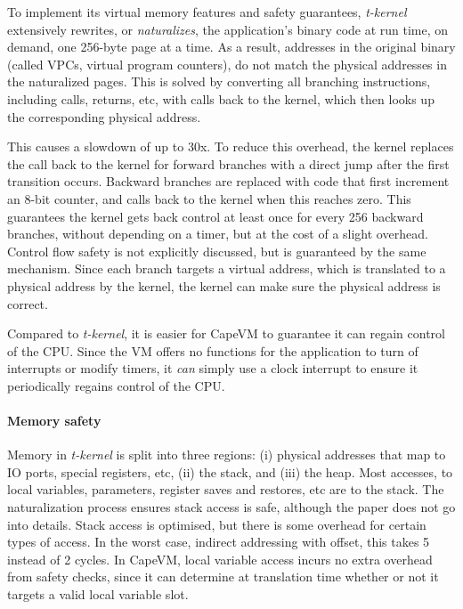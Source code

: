 To implement its virtual memory features and safety guarantees, \emph{t-kernel} extensively rewrites, or \emph{naturalizes}, the application's binary code at run time, on demand, one 256-byte page at a time. As a result, addresses in the original binary (called VPCs, virtual program counters), do not match the physical addresses in the naturalized pages. This is solved by converting all branching instructions, including calls, returns, etc, with calls back to the kernel, which then looks up the corresponding physical address.

This causes a slowdown of up to 30x. To reduce this overhead, the kernel replaces the call back to the kernel for forward branches with a direct jump after the first transition occurs. Backward branches are replaced with code that first increment an 8-bit counter, and calls back to the kernel when this reaches zero. This guarantees the kernel gets back control at least once for every 256 backward branches, without depending on a timer, but at the cost of a slight overhead. Control flow safety is not explicitly discussed, but is guaranteed by the same mechanism. Since each branch targets a virtual address, which is translated to a physical address by the kernel, the kernel can make sure the physical address is correct.

Compared to \emph{t-kernel}, it is easier for CapeVM to guarantee it can regain control of the CPU. Since the VM offers no functions for the application to turn of interrupts or modify timers, it \emph{can} simply use a clock interrupt to ensure it periodically regains control of the CPU.


\paragraph{Memory safety}
Memory in \emph{t-kernel} is split into three regions: (i) physical addresses that map to IO ports, special registers, etc, (ii) the stack, and (iii) the heap. Most accesses, to local variables, parameters, register saves and restores, etc are to the stack. The naturalization process ensures stack access is safe, although the paper does not go into details. Stack access is optimised, but there is some overhead for certain types of access. In the worst case, indirect addressing with offset, this takes 5 instead of 2 cycles. In CapeVM, local variable access incurs no extra overhead from safety checks, since it can determine at translation time whether or not it targets a valid local variable slot.


